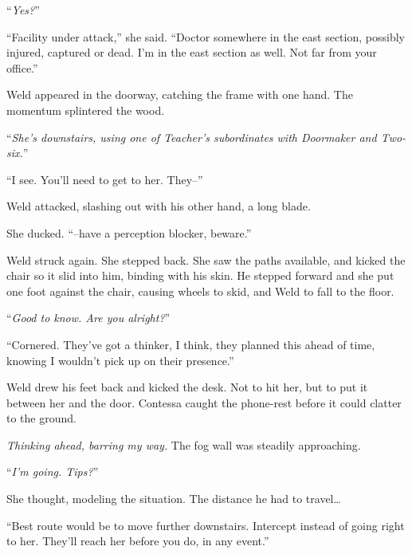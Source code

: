 ``\emph{Yes?}''



``Facility under attack,'' she said.  ``Doctor somewhere in the east section, possibly injured, captured or dead.  I'm in the east section as well.  Not far from your office.''



Weld appeared in the doorway, catching the frame with one hand.  The momentum splintered the wood.



``\emph{She's downstairs, using one of Teacher's subordinates with Doormaker and Two-six.}''



``I see.  You'll need to get to her.  They--''



Weld attacked, slashing out with his other hand, a long blade.



She ducked.  ``--have a perception blocker, beware.''



Weld struck again.  She stepped back.  She saw the paths available, and kicked the chair so it slid into him, binding with his skin.  He stepped forward and she put one foot against the chair, causing wheels to skid, and Weld to fall to the floor.



``\emph{Good to know.  Are you alright?}''



``Cornered.  They've got a thinker, I think, they planned this ahead of time, knowing I wouldn't pick up on their presence.''



Weld drew his feet back and kicked the desk.  Not to hit her, but to put it between her and the door.  Contessa caught the phone-rest before it could clatter to the ground.



\emph{Thinking ahead, barring my way.  }The fog wall was steadily approaching.



``\emph{I'm going.  Tips?}''



She thought, modeling the situation.  The distance he had to travel\ldots



``Best route would be to move further downstairs.  Intercept instead of going right to her.  They'll reach her before you do, in any event.''



